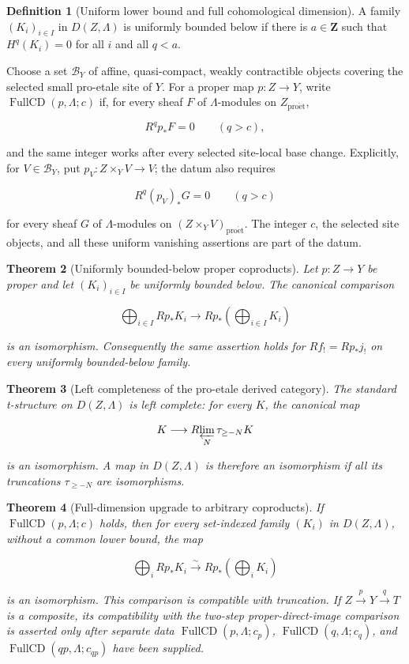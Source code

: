 \documentclass[10pt]{article}
\newtheorem{theorem}{Theorem}[section]
\theoremstyle{definition}
\newtheorem{definition}[theorem]{Definition}
\begin{document}
\begin{definition}[Uniform lower bound and full cohomological dimension]
\label{def:full-cd}
A family \((K_i)_{i\in I}\) in \(D(Z,\Lambda)\) is uniformly bounded below
if there is \(a\in\mathbf Z\) such that \(H^q(K_i)=0\) for all \(i\) and
all \(q<a\).

Choose a set \(\mathcal B_Y\) of affine, quasi-compact, weakly contractible
objects covering the selected small pro-etale site of \(Y\).  For a proper
map \(p:Z\to Y\), write \(\operatorname{FullCD}(p,\Lambda;c)\) if, for every
sheaf \(F\) of \(\Lambda\)-modules on \(Z_{\mathrm{pro\acute et}}\),

\[
 R^qp_*F=0\qquad(q>c),
\]

and the same integer works after every selected site-local base change.
Explicitly, for \(V\in\mathcal B_Y\), put
\(p_V:Z\times_YV\to V\); the datum also requires

\[
 R^q(p_V)_*G=0\qquad(q>c)
\]

for every sheaf \(G\) of \(\Lambda\)-modules on
\((Z\times_YV)_{\mathrm{pro\acute et}}\).  The integer \(c\), the selected
site objects, and all these uniform vanishing assertions are part of the
datum.
\end{definition}

\begin{theorem}[Uniformly bounded-below proper coproducts]
Let \(p:Z\to Y\) be proper and let \((K_i)_{i\in I}\) be uniformly bounded
below.  The canonical comparison

\[
 \bigoplus_{i\in I}Rp_*K_i\longrightarrow
 Rp_*\!\left(\bigoplus_{i\in I}K_i\right)
\]

is an isomorphism.  Consequently the same assertion holds for
\(Rf_!=Rp_*j_!\) on every uniformly bounded-below family.
\end{theorem}

\begin{theorem}[Left completeness of the pro-etale derived category]
The standard t-structure on \(D(Z,\Lambda)\) is left complete: for every
\(K\), the canonical map

\[
 K\longrightarrow R\!\varprojlim_{N}\tau_{\geq-N}K
\]

is an isomorphism.  A map in \(D(Z,\Lambda)\) is therefore an isomorphism if
all its truncations \(\tau_{\geq-N}\) are isomorphisms.
\end{theorem}

\begin{theorem}[Full-dimension upgrade to arbitrary coproducts]
If \(\operatorname{FullCD}(p,\Lambda;c)\) holds, then for every set-indexed
family \((K_i)\) in \(D(Z,\Lambda)\), without a common lower bound, the map

\[
 \bigoplus_iRp_*K_i\xrightarrow{\sim}Rp_*\!\left(\bigoplus_iK_i\right)
\]

is an isomorphism.  This comparison is compatible with truncation.  If
\(Z\xrightarrow pY\xrightarrow qT\) is a composite, its compatibility with
the two-step proper-direct-image comparison is asserted only after separate
data \(\operatorname{FullCD}(p,\Lambda;c_p)\),
\(\operatorname{FullCD}(q,\Lambda;c_q)\), and
\(\operatorname{FullCD}(qp,\Lambda;c_{qp})\) have been supplied.
\end{theorem}
\end{document}
